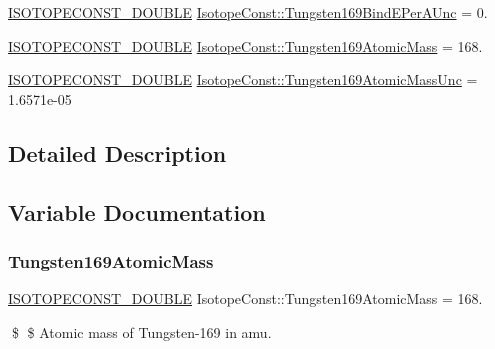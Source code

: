 \begin{DoxyCompactItemize}
\mbox{\hyperlink{group___isotope_const-_macros_ga8f45a7272ce02c0b4c65c44636ed719a}{I\+S\+O\+T\+O\+P\+E\+C\+O\+N\+S\+T\+\_\+\+D\+O\+U\+B\+LE}} \mbox{\hyperlink{group___isotope_const-_tungsten-_w169_gafcd32792efa53c68f8346dba6945c275}{Isotope\+Const\+::\+Tungsten169\+Bind\+E\+Per\+A\+Unc}} = 0.
\item 
\mbox{\hyperlink{group___isotope_const-_macros_ga8f45a7272ce02c0b4c65c44636ed719a}{I\+S\+O\+T\+O\+P\+E\+C\+O\+N\+S\+T\+\_\+\+D\+O\+U\+B\+LE}} \mbox{\hyperlink{group___isotope_const-_tungsten-_w169_ga3e6c61fa141c1bbf5008d1a582877f6f}{Isotope\+Const\+::\+Tungsten169\+Atomic\+Mass}} = 168.
\item 
\mbox{\hyperlink{group___isotope_const-_macros_ga8f45a7272ce02c0b4c65c44636ed719a}{I\+S\+O\+T\+O\+P\+E\+C\+O\+N\+S\+T\+\_\+\+D\+O\+U\+B\+LE}} \mbox{\hyperlink{group___isotope_const-_tungsten-_w169_gadb89dfc96f86125a37d4dd0547d3d3e3}{Isotope\+Const\+::\+Tungsten169\+Atomic\+Mass\+Unc}} = 1.\+6571e-\/05
\end{DoxyCompactItemize}


\subsection{Detailed Description}


\subsection{Variable Documentation}
\mbox{\label{group___isotope_const-_tungsten-_w169_ga3e6c61fa141c1bbf5008d1a582877f6f}} 
\subsubsection{\texorpdfstring{Tungsten169\+Atomic\+Mass}{Tungsten169AtomicMass}}
{\footnotesize\ttfamily \mbox{\hyperlink{group___isotope_const-_macros_ga8f45a7272ce02c0b4c65c44636ed719a}{I\+S\+O\+T\+O\+P\+E\+C\+O\+N\+S\+T\+\_\+\+D\+O\+U\+B\+LE}} Isotope\+Const\+::\+Tungsten169\+Atomic\+Mass = 168.}

\$ \$ Atomic mass of Tungsten-\/169 in amu. \mbox{\label{group___isotope_const-_tungsten-_w169_gadb89dfc96f86125a37d4dd0547d3d3e3}} 
